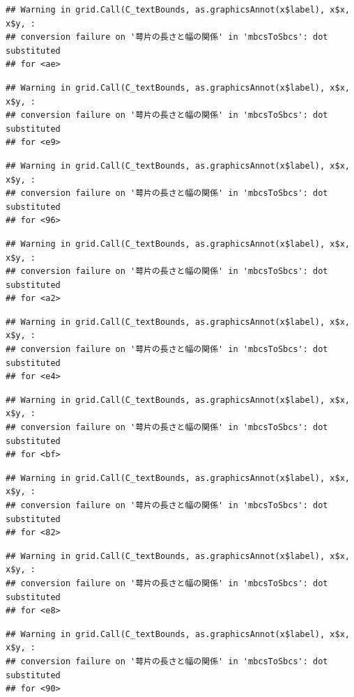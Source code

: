 \documentclass[
]{book}
\begin{document}
\begin{verbatim}
## Warning in grid.Call(C_textBounds, as.graphicsAnnot(x$label), x$x, x$y, :
## conversion failure on '萼片の長さと幅の関係' in 'mbcsToSbcs': dot substituted
## for <ae>
\end{verbatim}

\begin{verbatim}
## Warning in grid.Call(C_textBounds, as.graphicsAnnot(x$label), x$x, x$y, :
## conversion failure on '萼片の長さと幅の関係' in 'mbcsToSbcs': dot substituted
## for <e9>
\end{verbatim}

\begin{verbatim}
## Warning in grid.Call(C_textBounds, as.graphicsAnnot(x$label), x$x, x$y, :
## conversion failure on '萼片の長さと幅の関係' in 'mbcsToSbcs': dot substituted
## for <96>
\end{verbatim}

\begin{verbatim}
## Warning in grid.Call(C_textBounds, as.graphicsAnnot(x$label), x$x, x$y, :
## conversion failure on '萼片の長さと幅の関係' in 'mbcsToSbcs': dot substituted
## for <a2>
\end{verbatim}

\begin{verbatim}
## Warning in grid.Call(C_textBounds, as.graphicsAnnot(x$label), x$x, x$y, :
## conversion failure on '萼片の長さと幅の関係' in 'mbcsToSbcs': dot substituted
## for <e4>
\end{verbatim}

\begin{verbatim}
## Warning in grid.Call(C_textBounds, as.graphicsAnnot(x$label), x$x, x$y, :
## conversion failure on '萼片の長さと幅の関係' in 'mbcsToSbcs': dot substituted
## for <bf>
\end{verbatim}

\begin{verbatim}
## Warning in grid.Call(C_textBounds, as.graphicsAnnot(x$label), x$x, x$y, :
## conversion failure on '萼片の長さと幅の関係' in 'mbcsToSbcs': dot substituted
## for <82>
\end{verbatim}

\begin{verbatim}
## Warning in grid.Call(C_textBounds, as.graphicsAnnot(x$label), x$x, x$y, :
## conversion failure on '萼片の長さと幅の関係' in 'mbcsToSbcs': dot substituted
## for <e8>
\end{verbatim}

\begin{verbatim}
## Warning in grid.Call(C_textBounds, as.graphicsAnnot(x$label), x$x, x$y, :
## conversion failure on '萼片の長さと幅の関係' in 'mbcsToSbcs': dot substituted
## for <90>
\end{verbatim}
\end{document}
